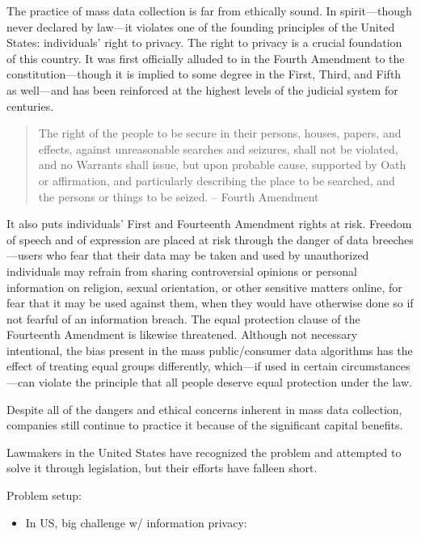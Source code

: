 \documentclass[water,article,submit,moreauthors,pdftex]{mdpi}
\providecommand{\tightlist}{%
  \setlength{\itemsep}{0pt}\setlength{\parskip}{4pt}}
\begin{document}
The practice of mass data collection is far from ethically sound. In
spirit---though never declared by law---it violates one of the founding
principles of the United States: individuals' right to privacy. The
right to privacy is a crucial foundation of this country. It was first
officially alluded to in the Fourth Amendment to the
constitution---though it is implied to some degree in the First, Third,
and Fifth as well---and has been reinforced at the highest levels of the
judicial system for centuries.

\begin{quote}
The right of the people to be secure in their persons, houses, papers,
and effects, against unreasonable searches and seizures, shall not be
violated, and no Warrants shall issue, but upon probable cause,
supported by Oath or affirmation, and particularly describing the place
to be searched, and the persons or things to be seized. -- Fourth
Amendment
\end{quote}

It also puts individuals' First and Fourteenth Amendment rights at risk.
Freedom of speech and of expression are placed at risk through the
danger of data breeches---users who fear that their data may be taken
and used by unauthorized individuals may refrain from sharing
controversial opinions or personal information on religion, sexual
orientation, or other sensitive matters online, for fear that it may be
used against them, when they would have otherwise done so if not fearful
of an information breach. The equal protection clause of the Fourteenth
Amendment is likewise threatened. Although not necessary intentional,
the bias present in the mass public/consumer data algorithms has the
effect of treating equal groups differently, which---if used in certain
circumstances---can violate the principle that all people deserve equal
protection under the law.

Despite all of the dangers and ethical concerns inherent in mass data
collection, companies still continue to practice it because of the
significant capital benefits.

Lawmakers in the United States have recognized the problem and attempted
to solve it through legislation, but their efforts have falleen short.

Problem setup:

\begin{itemize}
\tightlist
\item
  In US, big challenge w/ information privacy:
\end{itemize}
\end{document}
